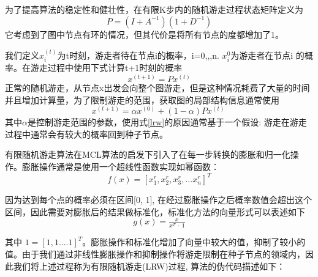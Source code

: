 为了提高算法的稳定性和健壮性，在有限K步内的随机游走过程状态矩阵定义为
\begin{equation}
	P=(I+A^{-1})(1+D^{-1})
\end{equation}
它考虑到了图中节点有环的情况，但其代价是将所有节点的度都增加了1。

我们定义$x_{i}^{(t)}$为t时刻，游走者待在节点i的概率，i=0,,,n. $x_{i}^{0}$为游走者在节点i 的概率。在游走过程中使用下式计算t+1时刻的概率
\begin{equation}
	x^{(t+1)}=Px^{(t)}
\end{equation}
正常的随机游走，从节点x出发会向整个图游走，但是这种情况耗费了大量的时间并且增加计算量，为了限制游走的范围，获取图的局部结构信息通常使用
 \begin{equation}
 x^{( t+1)} =\alpha x^{( 0)} +( 1-\alpha ) Px^{( t)} \
 \label{lrw}
 \end{equation}
 其中$\alpha$是控制游走范围的参数，使用式\ref{lrw}的原因通常基于一个假设: 游走在游走过程中通常会有较大的概率回到种子节点。

 有限随机游走算法在MCL算法的启发下引入了在每一步转换的膨胀和归一化操作。膨胀操作通常是使用一个超线性函数实现如幂函数：
 \begin{equation}
f( x) =\left[ x^{r}_{1} ,x^{r}_{2} ,x^{r}_{3} ,...x^{r}_{n}\right]^{T}
\label{inflation}
\end{equation}

因为达到每个点的概率必须在区间[0, 1], 在经过膨胀操作之后概率数值会超出这个区间，因此需要对膨胀后的结果做标准化，标准化方法的向量形式可以表述如下
 \begin{equation}
g( x) =\tfrac{x}{x^{T} \ \cdotp \ 1}
 \end{equation}

其中 $1 = [1,1....1]^{T}$。膨胀操作和标准化增加了向量中较大的值，抑制了较小的值。由于我们通过非线性膨胀操作和抑制操作将游走限制在种子节点的领域内，因此我们将上述过程称为有限随机游走(LRW)过程, 算法的伪代码描述如下：
\\
\\
\\

